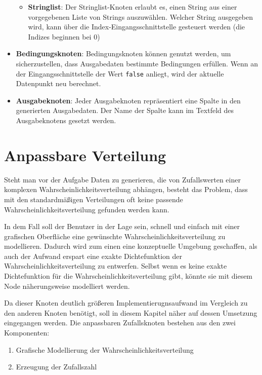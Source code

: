 \begin{itemize}
\begin{itemize}
        \item \textbf{Stringlist}: Der Stringlist-Knoten erlaubt es, einen String aus einer vorgegebenen Liste von Strings auszuwählen. Welcher String ausgegeben wird, kann über die Index-Eingangsschnittstelle gesteuert werden (die Indizes beginnen bei 0)
    \end{itemize}
    \item \textbf{Bedingungsknoten}: Bedingungsknoten können genutzt werden, um sicherzustellen, dass Ausgabedaten bestimmte Bedingungen erfüllen. Wenn an der Eingangsschnittstelle der Wert \texttt{false} anliegt, wird der aktuelle Datenpunkt neu berechnet.
    \item \textbf{Ausgabeknoten}: Jeder Ausgabeknoten repräsentiert eine Spalte in den generierten Ausgabedaten. Der Name der Spalte kann im Textfeld des Ausgabeknotens gesetzt werden.
\end{itemize}

\section{Anpassbare Verteilung}
\label{sec:anpassbareverteilung}

Steht man vor der Aufgabe Daten zu generieren, die von Zufallswerten einer komplexen Wahrscheinlichkeitsverteilung abhängen, besteht das Problem, dass mit den standardmäßigen Verteilungen oft keine passende Wahrscheinlichkeitsverteilung gefunden werden kann. 

In dem Fall soll der Benutzer in der Lage sein, schnell und einfach mit einer grafischen Oberfläche eine gewünschte Wahrscheinlichkeitsverteilung zu modellieren. Dadurch wird zum einen eine konzeptuelle Umgebung geschaffen, als auch der Aufwand erspart eine exakte Dichtefunktion der Wahrscheinlichkeitsverteilung zu entwerfen. Selbst wenn es keine exakte Dichtefunktion für die Wahrscheinlichkeitsverteilung gibt, könnte sie mit diesem Node näherungsweise modelliert werden.

Da dieser Knoten deutlich größeren Implementierugnsaufwand im Vergleich zu den anderen Knoten benötigt, soll in diesem Kapitel näher auf dessen Umsetzung eingegangen werden. Die anpassbaren Zufallsknoten bestehen aus den zwei Komponenten: 
\begin{enumerate}
    \item Grafische Modellierung der Wahrscheinlichkeitsverteilung
    \item Erzeugung der Zufallszahl
\end{enumerate}

